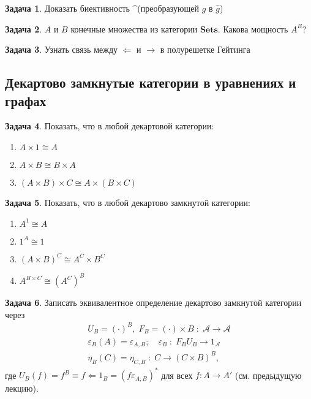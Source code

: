 \documentclass[10pt]{article}
\theoremstyle{definition}
\newtheorem{Pm}{Задача}[subsection]
\begin{document}
\begin{Pm}
    Доказать биективность \textasciicircum \;(преобразующей $g$ в $\hat{g}$)
\end{Pm}

\begin{Pm}
    $A$ и $B$ конечные множества из категории $\mathbf{Sets}$. Какова мощность $A^B$?
\end{Pm}

\begin{Pm}
    Узнать связь между $\Leftarrow$ и $\rightarrow$ в полурешетке Гейтинга
\end{Pm}

\subsection{Декартово замкнутые категории в уравнениях и графах}
\begin{Pm}
    Показать, что в любой декартовой категории:
    \begin{enumerate}
        \item $A \times 1 \cong A$
        \item $A \times B \cong B \times A$
        \item $(A \times B) \times C \cong A \times (B \times C)$
    \end{enumerate}
\end{Pm}

\begin{Pm}
    Показать, что в любой декартово замкнутой категории:
    \begin{enumerate}
        \item $A^1 \cong A$
        \item $1^A \cong 1$
        \item $(A \times B)^C \cong A^C \times B^C$
        \item $A^{B \times C} \cong (A^C)^B$
    \end{enumerate}
\end{Pm}

\begin{Pm}
    Записать эквивалентное определение декартово замкнутой категории через
    \begin{gather*}
        U_B = (\cdot)^B,\; F_B = (\cdot) \times B\; :\; \mathscr{A} \rightarrow \mathscr{A} \\
        \varepsilon_B(A) = \varepsilon_{A,B};\quad \varepsilon_B\; :\; F_B U_B \rightarrow 1_\mathscr{A} \\
        \eta_B(C) = \eta_{C,B}\; :\; C \rightarrow (C \times B)^B\text{,}
    \end{gather*}
    где $U_B(f) = f^B \equiv f \Leftarrow 1_B = (f\varepsilon_{A,B})^*$ для всех $f : A \rightarrow A'$ (см. предыдущую лекцию).
\end{Pm}
\end{document}
